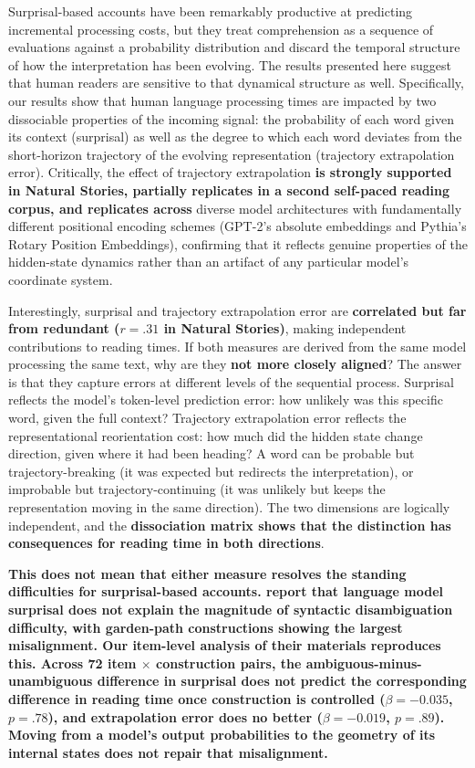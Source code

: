 \documentclass[12pt]{article}
\newcommand{\new}[1]{{\bfseries #1}}
\begin{document}
Surprisal-based accounts have been remarkably productive at predicting incremental processing costs, but they treat comprehension as a sequence of evaluations against a probability distribution and discard the temporal structure of how the interpretation has been evolving. The results presented here suggest that human readers are sensitive to that dynamical structure as well. Specifically, our results show that human language processing times are impacted by two dissociable properties of the incoming signal: the probability of each word given its context (surprisal) as well as the degree to which each word deviates from the short-horizon trajectory of the evolving representation (trajectory extrapolation error). Critically, the effect of trajectory extrapolation \new{is strongly supported in Natural Stories, partially replicates in a second self-paced reading corpus, and replicates across} diverse model architectures with fundamentally different positional encoding schemes (GPT-2's absolute embeddings and Pythia's Rotary Position Embeddings), confirming that it reflects genuine properties of the hidden-state dynamics rather than an artifact of any particular model's coordinate system.

Interestingly, surprisal and trajectory extrapolation error are \new{correlated but far from redundant ($r = .31$ in Natural Stories)}, making independent contributions to reading times. If both measures are derived from the same model processing the same text, why are they \new{not more closely aligned}? The answer is that they capture errors at different levels of the sequential process. Surprisal reflects the model's token-level prediction error: how unlikely was this specific word, given the full context? Trajectory extrapolation error reflects the representational reorientation cost: how much did the hidden state change direction, given where it had been heading? A word can be probable but trajectory-breaking (it was expected but redirects the interpretation), or improbable but trajectory-continuing (it was unlikely but keeps the representation moving in the same direction). The two dimensions are logically independent, and the \new{dissociation matrix shows that the distinction has consequences for reading time in both directions}.

\new{This does not mean that either measure resolves the standing difficulties for surprisal-based accounts. \citet{huang2024} report that language model surprisal does not explain the magnitude of syntactic disambiguation difficulty, with garden-path constructions showing the largest misalignment. Our item-level analysis of their materials reproduces this. Across 72 item $\times$ construction pairs, the ambiguous-minus-unambiguous difference in surprisal does not predict the corresponding difference in reading time once construction is controlled ($\beta = -0.035$, $p = .78$), and extrapolation error does no better ($\beta = -0.019$, $p = .89$). Moving from a model's output probabilities to the geometry of its internal states does not repair that misalignment.}
\end{document}
